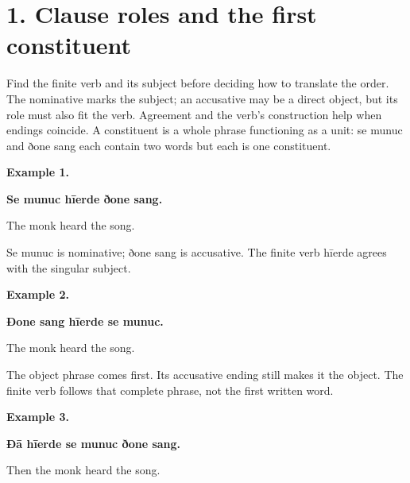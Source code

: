 \section*{1. Clause roles and the first constituent}

Find the finite verb and its subject before deciding how to translate the order. The nominative marks the subject; an accusative may be a direct object, but its role must also fit the verb. Agreement and the verb’s construction help when endings coincide. A constituent is a whole phrase functioning as a unit: se munuc and ðone sang each contain two words but each is one constituent.

\textbf{Example 1.}

\textbf{Se munuc hīerde ðone sang.}

The monk heard the song.

Se munuc is nominative; ðone sang is accusative. The finite verb hīerde agrees with the singular subject.

\textbf{Example 2.}

\textbf{Ðone sang hīerde se munuc.}

The monk heard the song.

The object phrase comes first. Its accusative ending still makes it the object. The finite verb follows that complete phrase, not the first written word.

\textbf{Example 3.}

\textbf{Ðā hīerde se munuc ðone sang.}

Then the monk heard the song.

